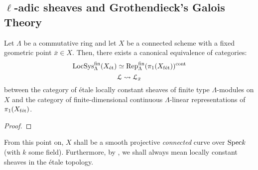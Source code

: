     \subsection{\texorpdfstring{$\ell$}{}-adic sheaves and Grothendieck's Galois Theory}
        \begin{lemma} \label{lemma: etale_monodromy}
            Let $\Lambda$ be a commutative ring and let $X$ be a connected scheme with a fixed geometric point $\bar{x} \in X$. Then, there exists a canonical equivalence of categories:
                $$\mathrm{LocSys}_{\Lambda}^{\mathrm{fin}}(X_{\mathrm{\acute{e}t}}) \simeq \mathrm{Rep}_{\Lambda}^{\mathrm{fin}}(\pi_1(X_{\mathrm{f\acute{e}t}}))^{\mathrm{cont}}$$
                $$\mathcal{L} \leadsto \mathcal{L}_{\bar{x}}$$
            between the category of \'etale locally constant sheaves of finite type $\Lambda$-modules on $X$ and the category of finite-dimensional continuous $\Lambda$-linear representations of $\pi_1(X_{\mathrm{f\acute{e}t}})$.
        \end{lemma}
            \begin{proof}
                
            \end{proof}
    
        \begin{convention} \label{conv: base_curve}
            From this point on, $X$ shall be a smooth projective \textit{connected} curve over $\mathrm{Spec} k$ (with $k$ some field). Furthermore, by , we shall always mean locally constant sheaves in the \'etale topology.
        \end{convention}
        
